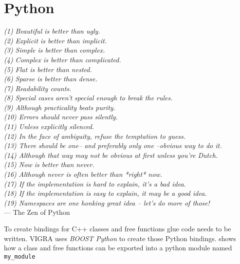 \section{Python}\label{sec:graph_lib_python}

\begin{scriptsize}
\begin{flushright}{\slshape    
(1) Beautiful is better than ugly. \\ \label{cit:line_a}
(2) Explicit is better than implicit. \\ \label{cit:line_b}
(3) Simple is better than complex. \\
(4) Complex is better than complicated. \\
(5) Flat is better than nested. \\
(6) Sparse is better than dense. \\
(7) Readability counts. \\
(8) Special cases aren't special enough to break the rules. \\
(9) Although practicality beats purity. \\
(10) Errors should never pass silently. \\
(11) Unless explicitly silenced. \\
(12) In the face of ambiguity, refuse the temptation to guess. \\
(13) There should be one-- and preferably only one --obvious way to do it. \\
(14) Although that way may not be obvious at first unless you're Dutch. \\
(15) Now is better than never. \\
(16) Although never is often better than *right* now. \\
(17) If the implementation is hard to explain, it's a bad idea. \\
(18) If the implementation is easy to explain, it may be a good idea. \\
(19) Namespaces are one honking great idea -- let's do more of those! } \\ \medskip
--- The Zen of Python
\end{flushright}
\end{scriptsize}



To create bindings for C++ classes and free functions glue code needs to 
be written. VIGRA\citep{ software_vigra,koethe_2000_phd_thesis} uses \emph{BOOST Python}\citep{ boost_python}  to create those Python bindings.
 shows how a  class and free functions can
be exported into a python module named \lstinline{my_module}

